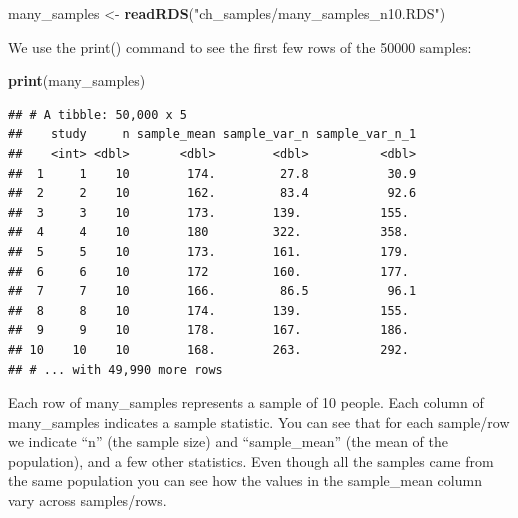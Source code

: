 \documentclass[
]{krantz}
\makeatletter
\newenvironment{Shaded}{\begin{snugshade}}{\end{snugshade}}
\newcommand{\KeywordTok}[1]{\textcolor[rgb]{0.27,0.27,0.27}{\textbf{#1}}}
\newcommand{\NormalTok}[1]{#1}
\newcommand{\StringTok}[1]{\textcolor[rgb]{0.5,0.5,0.5}{#1}}
\newenvironment{kframe}{%
\medskip{}
\setlength{\fboxsep}{.8em}
 \def\at@end@of@kframe{}%
 \ifinner\ifhmode%
  \def\at@end@of@kframe{\end{minipage}}%
  \begin{minipage}{\columnwidth}%
 \fi\fi%
 \def\FrameCommand##1{\hskip\@totalleftmargin \hskip-\fboxsep
 \colorbox{shadecolor}{##1}\hskip-\fboxsep
     \hskip-\linewidth \hskip-\@totalleftmargin \hskip\columnwidth}%
 \MakeFramed {\advance\hsize-\width
   \@totalleftmargin\z@ \linewidth\hsize
   \@setminipage}}%
 {\par\unskip\endMakeFramed%
 \at@end@of@kframe}
\renewenvironment{Shaded}{\begin{kframe}}{\end{kframe}}
\makeatother
\begin{document}
\begin{Shaded}
\begin{Highlighting}[]
\NormalTok{many_samples <-}\StringTok{ }\KeywordTok{readRDS}\NormalTok{(}\StringTok{"ch_samples/many_samples_n10.RDS"}\NormalTok{)}
\end{Highlighting}
\end{Shaded}

We use the print() command to see the first few rows of the 50000 samples:

\begin{Shaded}
\begin{Highlighting}[]
\KeywordTok{print}\NormalTok{(many_samples)}
\end{Highlighting}
\end{Shaded}

\begin{verbatim}
## # A tibble: 50,000 x 5
##    study     n sample_mean sample_var_n sample_var_n_1
##    <int> <dbl>       <dbl>        <dbl>          <dbl>
##  1     1    10        174.         27.8           30.9
##  2     2    10        162.         83.4           92.6
##  3     3    10        173.        139.           155. 
##  4     4    10        180         322.           358. 
##  5     5    10        173.        161.           179. 
##  6     6    10        172         160.           177. 
##  7     7    10        166.         86.5           96.1
##  8     8    10        174.        139.           155. 
##  9     9    10        178.        167.           186. 
## 10    10    10        168.        263.           292. 
## # ... with 49,990 more rows
\end{verbatim}

Each row of many\_samples represents a sample of 10 people. Each column of many\_samples indicates a sample statistic. You can see that for each sample/row we indicate ``n'' (the sample size) and ``sample\_mean'' (the mean of the population), and a few other statistics. Even though all the samples came from the same population you can see how the values in the sample\_mean column vary across samples/rows.
\end{document}
